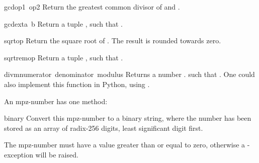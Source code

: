 \begin{funcdesc}{gcd}{op1\, op2}
  Return the greatest common divisor of  and .
\end{funcdesc}

\begin{funcdesc}{gcdext}{a\, b}
  Return a tuple , such that
  .
\end{funcdesc}

\begin{funcdesc}{sqrt}{op}
  Return the square root of . The result is rounded towards zero.
\end{funcdesc}

\begin{funcdesc}{sqrtrem}{op}
  Return a tuple , such that
  .
\end{funcdesc}

\begin{funcdesc}{divm}{numerator\, denominator\, modulus}
  Returns a number . such that
  .
  One could also implement this function in Python, using .
\end{funcdesc}

An mpz-number has one method:

\renewcommand{\indexsubitem}{(mpz method)}
\begin{funcdesc}{binary}{}
  Convert this mpz-number to a binary string, where the number has been
  stored as an array of radix-256 digits, least significant digit first.

  The mpz-number must have a value greater than or equal to zero,
  otherwise a -exception will be raised.
\end{funcdesc}
